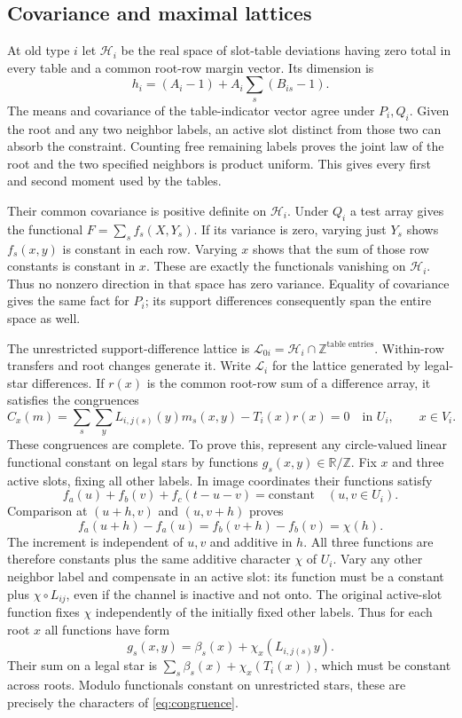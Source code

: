 \documentclass[11pt]{article}
\begin{document}
\subsection*{Covariance and maximal lattices}
At old type $i$ let $\mathcal H_i$ be the real space of slot-table deviations having zero total in every table and a common root-row margin vector. Its dimension is
\[
 h_i=(A_i-1)+A_i\sum_s(B_{is}-1).
\]
The means and covariance of the table-indicator vector agree under $P_i,Q_i$. Given the root and any two neighbor labels, an active slot distinct from those two can absorb the constraint. Counting free remaining labels proves the joint law of the root and the two specified neighbors is product uniform. This gives every first and second moment used by the tables.

Their common covariance is positive definite on $\mathcal H_i$. Under $Q_i$ a test array gives the functional $F=\sum_s f_s(X,Y_s)$. If its variance is zero, varying just $Y_s$ shows $f_s(x,y)$ is constant in each row. Varying $x$ shows that the sum of those row constants is constant in $x$. These are exactly the functionals vanishing on $\mathcal H_i$. Thus no nonzero direction in that space has zero variance. Equality of covariance gives the same fact for $P_i$; its support differences consequently span the entire space as well.

The unrestricted support-difference lattice is $\mathcal L_{0i}=\mathcal H_i\cap\mathbb Z^{\text{table entries}}$. Within-row transfers and root changes generate it. Write $\mathcal L_i$ for the lattice generated by legal-star differences. If $r(x)$ is the common root-row sum of a difference array, it satisfies the congruences
\begin{equation}\label{eq:congruence}
 C_x(m)=\sum_s\sum_yL_{i,j(s)}(y)m_s(x,y)-T_i(x)r(x)=0
 \quad\text{in }U_i,\qquad x\in V_i.
\end{equation}
These congruences are complete. To prove this, represent any circle-valued linear functional constant on legal stars by functions $g_s(x,y)\in\mathbb R/\mathbb Z$. Fix $x$ and three active slots, fixing all other labels. In image coordinates their functions satisfy
\[
 f_a(u)+f_b(v)+f_c(t-u-v)=\text{constant}\quad(u,v\in U_i).
\]
Comparison at $(u+h,v)$ and $(u,v+h)$ proves
\[
 f_a(u+h)-f_a(u)=f_b(v+h)-f_b(v)=\chi(h).
\]
The increment is independent of $u,v$ and additive in $h$. All three functions are therefore constants plus the same additive character $\chi$ of $U_i$. Vary any other neighbor label and compensate in an active slot: its function must be a constant plus $\chi\circ L_{ij}$, even if the channel is inactive and not onto. The original active-slot function fixes $\chi$ independently of the initially fixed other labels. Thus for each root $x$ all functions have form
\[
 g_s(x,y)=\beta_s(x)+\chi_x(L_{i,j(s)}y).
\]
Their sum on a legal star is $\sum_s\beta_s(x)+\chi_x(T_i(x))$, which must be constant across roots. Modulo functionals constant on unrestricted stars, these are precisely the characters of \eqref{eq:congruence}.
\end{document}
